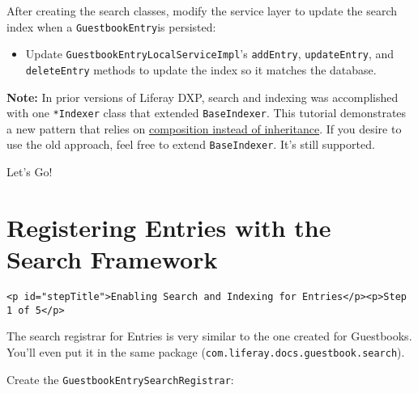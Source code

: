 After creating the search classes, modify the service layer to update
the search index when a \texttt{GuestbookEntry}is persisted:

\begin{itemize}
\tightlist
\item
  Update \texttt{GuestbookEntryLocalServiceImpl}'s \texttt{addEntry},
  \texttt{updateEntry}, and \texttt{deleteEntry} methods to update the
  index so it matches the database.
\end{itemize}

\noindent\hrulefill

\textbf{Note:} In prior versions of Liferay DXP, search and indexing was
accomplished with one \texttt{*Indexer} class that extended
\texttt{BaseIndexer}. This tutorial demonstrates a new pattern that
relies on
\href{https://stackoverflow.com/questions/2399544/difference-between-inheritance-and-composition}{composition
instead of inheritance}. If you desire to use the old approach, feel
free to extend \texttt{BaseIndexer}. It's still supported.

\noindent\hrulefill

Let's Go!{}

\chapter{Registering Entries with the Search
Framework}\label{registering-entries-with-the-search-framework}

\begin{verbatim}
<p id="stepTitle">Enabling Search and Indexing for Entries</p><p>Step 1 of 5</p>
\end{verbatim}

The search registrar for Entries is very similar to the one created for
Guestbooks. You'll even put it in the same package
(\texttt{com.liferay.docs.guestbook.search}).

Create the \texttt{GuestbookEntrySearchRegistrar}:

